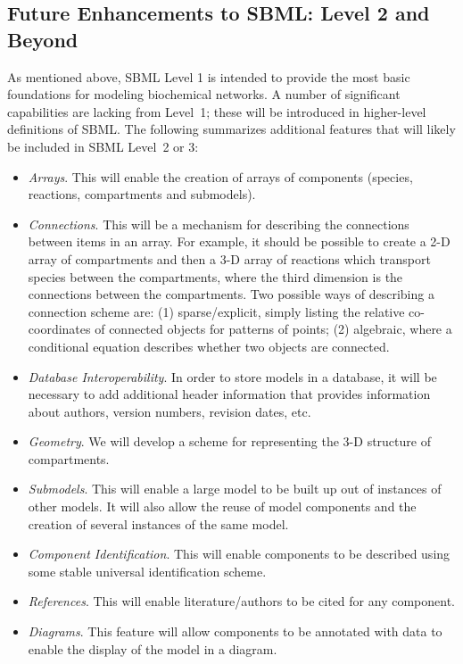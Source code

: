 \documentclass[10pt]{cekarticle}
\newcommand{\changed}[1]{\textcolor{BrickRed}{#1}}
\begin{document}
\subsection{Future Enhancements to SBML: Level 2 and Beyond}
\label{sec:level-2}

As mentioned above, SBML Level 1 is intended to provide the most basic
foundations for modeling biochemical networks.  A number of significant
capabilities are lacking from Level~1; these will be introduced in
higher-level definitions of SBML.  The following summarizes additional
features that will likely be included in SBML Level~2 \changed{or 3}:
\begin{itemize}  
  
\item \emph{Arrays}.  This will enable the creation of arrays of components
  (species, reactions, compartments and submodels).
   
\item \emph{Connections}.  This will be a mechanism for describing the
  connections between items in an array.  For example, it should be
  possible to create a 2-D array of compartments and then a 3-D array of
  reactions which transport species between the compartments, where the
  third dimension is the connections between the compartments.  Two
  possible ways of describing a connection scheme are: (1) sparse/explicit,
  simply listing the relative co-coordinates of connected objects for
  patterns of points; (2) algebraic, where a conditional equation describes
  whether two objects are connected.
  
\item \emph{Database Interoperability}.  In order to store models in a
  database, it will be necessary to add additional header information that
  provides information about authors, version numbers, revision dates, etc.

\item \emph{Geometry}.  We will develop a scheme for representing the 3-D
  structure of compartments.
  
\item \emph{Submodels}.  This will enable a large model to be built up out
  of instances of other models.  It will also allow the reuse of model
  components and the creation of several instances of the same model.
  
\item \emph{Component Identification}.  This will enable components to be
  described using some stable universal identification scheme.
  
\item \emph{References}.  This will enable literature/authors to be cited
  for any component.
  
\item \emph{Diagrams}.  \changed{This feature will allow components to be annotated
  with data to enable the display of the model in a diagram.}

\end{itemize}
\end{document}
